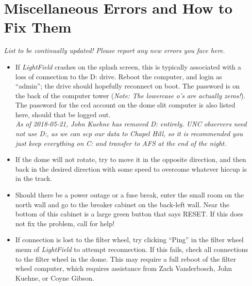 \documentclass[12pt]{article}
\begin{document}
\section{Miscellaneous Errors and How to Fix Them}
\textit{List to be continually updated! Please report any new errors you face here.}
\begin{itemize}
   \item If \textit{LightField} crashes on the splash screen, this is typically associated with a loss of connection to the D: drive. Reboot the computer, and login as ``admin''; the drive should hopefully reconnect on boot. The password is on the back of the computer tower (\textit{Note: The lowercase o's are actually zeros!}). The password for the ccd account on the dome slit computer is also listed here, should that be logged out.\\
   \textit{As of 2018-05-21, John Kuehne has removed D: entirely. UNC observers need not use D:, as we can scp our data to Chapel Hill, so it is recommended you just keep everything on C: and transfer to AFS at the end of the night.}
   \item If the dome will not rotate, try to move it in the opposite direction, and then back in the desired direction with some speed to overcome whatever hiccup is in the track.
   \item Should there be a power outage or a fuse break, enter the small room on the north wall and go to the breaker cabinet on the back-left wall. Near the bottom of this cabinet is a large green button that says RESET. If this does not fix the problem, call for help!
   \item If connection is lost to the filter wheel, try clicking ``Ping'' in the filter wheel menu of \textit{LightField} to attempt reconnection. If this fails, check all connections to the filter wheel in the dome. This may require a full reboot of the filter wheel computer, which requires assistance from Zach Vanderbosch, John Kuehne, or Coyne Gibson.
\end{itemize}
\end{document}
